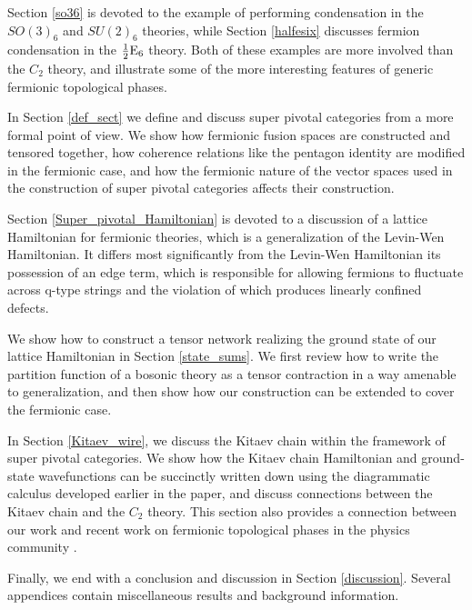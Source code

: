 Section \ref{so36} is devoted to the example of performing condensation in the $SO(3)_6$ 
and $SU(2)_6$ theories, while Section \ref{halfesix} discusses fermion condensation in the $
\frac{1}{2}\text{E}_6$ theory. 
Both of these examples are more involved than the $C_2$ theory, 
and illustrate some of the more interesting features of generic fermionic topological phases. 

In Section \ref{def_sect} we define and discuss super pivotal categories from a more formal point of view. 
We show how fermionic fusion spaces are constructed and tensored together, how 
coherence relations like the pentagon identity are modified in the fermionic case, 
and how the fermionic nature of the vector spaces used in the construction of super 
pivotal categories affects their construction. 

Section \ref{Super_pivotal_Hamiltonian} is devoted to a discussion of a lattice Hamiltonian for fermionic theories, which is a generalization of the Levin-Wen Hamiltonian. 
It differs most significantly from the Levin-Wen Hamiltonian its possession of an edge term, which 
is responsible for allowing fermions to fluctuate across q-type strings and the violation 
of which produces linearly confined defects. 

We show how to construct a tensor network realizing the ground state of our lattice Hamiltonian 
in Section \ref{state_sums}. We first review how to write the partition function of a bosonic theory 
as a tensor contraction in a way amenable to generalization, and then show how our construction 
can be extended to cover the fermionic case. 

In Section \ref{Kitaev_wire}, we discuss the Kitaev chain within the framework of super pivotal 
categories. 
We show how the Kitaev chain Hamiltonian and ground-state wavefunctions can be 
succinctly written down using the diagrammatic calculus developed earlier in the paper, and 
discuss connections between the Kitaev chain and the $C_2$ theory. 
This section also provides a connection between our work 
and recent work on fermionic topological phases in the physics community \cite{ware2016,tarantino2016,turzillo2016}. 

Finally, we end with a conclusion and discussion in Section \ref{discussion}. 
Several appendices contain miscellaneous results and background information. 


\bigskip



